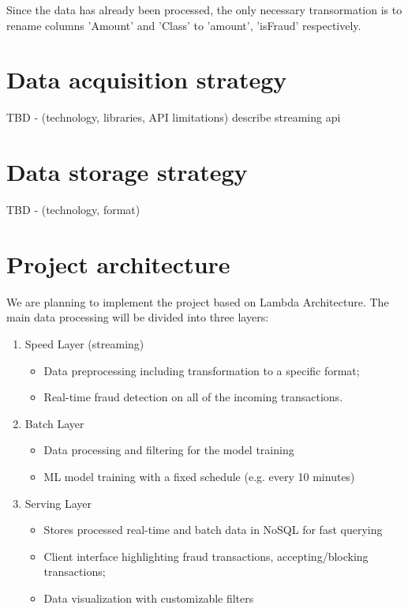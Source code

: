 \documentclass[12pt,a4paper, hidelinks]{article}
\begin{document}
Since the data has already been processed, the only necessary transormation is to rename columns 'Amount' and 'Class' to 'amount', 'isFraud' respectively.

\newpage

\section{Data acquisition strategy}

TBD - (technology, libraries, API limitations)
describe streaming api

\section{Data storage strategy}

TBD - (technology, format)

\section{Project architecture}

We are planning to implement the project based on Lambda Architecture. The main data processing will be divided into three layers:

\begin{enumerate}
    \item Speed Layer (streaming)
        \begin{itemize}
            \item Data preprocessing including transformation to a specific format;
            \item Real-time fraud detection on all of the incoming transactions.
        \end{itemize}
    \item Batch Layer
        \begin{itemize}
            \item Data processing and filtering for the model training
            \item ML model training with a fixed schedule (e.g. every 10 minutes)
        \end{itemize}
    \item Serving Layer
        \begin{itemize}
            \item Stores processed real-time and batch data in NoSQL for fast querying
            \item Client interface highlighting fraud transactions, accepting/blocking transactions;
            \item Data visualization with customizable filters
        \end{itemize}
\end{enumerate}
\end{document}
